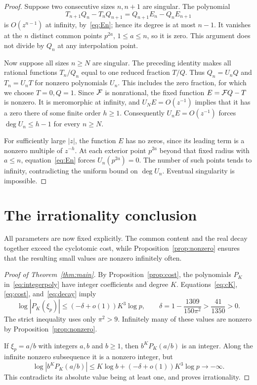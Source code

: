 \documentclass[11pt,letterpaper]{article}
\numberwithin{equation}{section}
\theoremstyle{remark}\newtheorem{remark}[theorem]{Remark}
\begin{document}
\begin{proof}
Suppose two consecutive sizes $n,n+1$ are singular. The polynomial
\begin{equation*}
 T_{n+1}Q_n-T_nQ_{n+1}
 =Q_{n+1}E_n-Q_nE_{n+1}
\end{equation*}
is $O(z^{n-1})$ at infinity, by~\eqref{eq:En}; hence its degree is at most $n-1$. It vanishes at the $n$ distinct common points $p^{2a}$, $1\le a\le n$, so it is zero. This argument does not divide by $Q_n$ at any interpolation point.

Now suppose all sizes $n\ge N$ are singular. The preceding identity makes all rational functions $T_n/Q_n$ equal to one reduced fraction $T/Q$. Thus $Q_n=U_nQ$ and $T_n=U_nT$ for nonzero polynomials $U_n$. This includes the zero fraction, for which we choose $T=0,Q=1$. Since $\mathcal F$ is nonrational, the fixed function $E=\mathcal F Q-T$ is nonzero. It is meromorphic at infinity, and $U_NE=O(z^{-1})$ implies that it has a zero there of some finite order $h\ge1$. Consequently $U_nE=O(z^{-1})$ forces $\deg U_n\le h-1$ for every $n\ge N$.

For sufficiently large $|z|$, the function $E$ has no zeros, since its leading term is a nonzero multiple of $z^{-h}$. At each exterior point $p^{2a}$ beyond that fixed radius with $a\le n$, equation~\eqref{eq:En} forces $U_n(p^{2a})=0$. The number of such points tends to infinity, contradicting the uniform bound on $\deg U_n$. Eventual singularity is impossible.
\end{proof}

\section{The irrationality conclusion}
All parameters are now fixed explicitly. The common content and the real decay together exceed the cyclotomic cost, while Proposition~\ref{prop:nonzero} ensures that the resulting small values are nonzero infinitely often.

\begin{proof}[Proof of Theorem~\ref{thm:main}]
By Proposition~\ref{prop:cost}, the polynomials $P_K$ in~\eqref{eq:integerpoly} have integer coefficients and degree $K$. Equations~\eqref{eq:cK}, \eqref{eq:cost}, and~\eqref{eq:decay} imply
\begin{equation}\label{eq:finalbound}
 \log|P_K(\xi_p)|\le(-\delta+o(1))K^3\log p,\qquad
 \delta=1-\frac{1309}{150\pi^2}>\frac{41}{1350}>0.
\end{equation}
The strict inequality uses only $\pi^2>9$. Infinitely many of these values are nonzero by Proposition~\ref{prop:nonzero}.

If $\xi_p=a/b$ with integers $a,b$ and $b\ge1$, then $b^KP_K(a/b)$ is an integer. Along the infinite nonzero subsequence it is a nonzero integer, but
\begin{equation*}
 \log|b^KP_K(a/b)|\le K\log b+(-\delta+o(1))K^3\log p\longrightarrow-\infty.
\end{equation*}
This contradicts its absolute value being at least one, and proves irrationality.
\end{proof}
\end{document}
